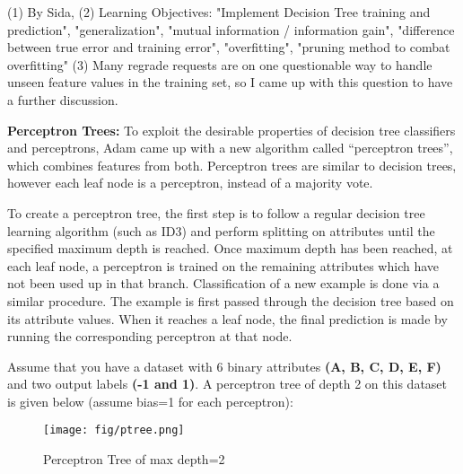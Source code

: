 \begin{questions}
\begin{qauthor}
    (1) By Sida, (2) Learning Objectives: "Implement Decision Tree training and prediction", "generalization", "mutual information / information gain", "difference between true error and training error", "overfitting", "pruning method to combat overfitting" (3) Many regrade requests are on one questionable way to handle unseen feature values in the training set, so I came up with this question to have a further discussion.
    \end{qauthor}

\question[]\textbf{Perceptron Trees: } To exploit the desirable properties of decision tree classifiers and perceptrons, Adam came up with a new algorithm called ``perceptron trees'', which combines features from both. Perceptron trees are similar to decision trees, however each leaf node is a perceptron, instead of a majority vote. 

To create a perceptron tree, the first step is to follow a regular decision tree learning algorithm (such as ID3) and perform splitting on attributes until the specified maximum depth is reached. Once maximum depth has been reached, at each leaf node, a perceptron is trained on the remaining attributes which have not been used up in that branch. Classification of a new example is done via a similar procedure. The example is first passed through the decision tree based on its attribute values. When it reaches a leaf node, the final prediction is made by running the corresponding perceptron at that node.

Assume that you have a dataset with 6 binary attributes \textbf{(A, B, C, D, E, F)} and two output labels \textbf{(-1 and 1)}. A perceptron tree of depth 2 on this dataset is given below (assume bias=1 for each perceptron):

\begin{figure}[H]
        \centering
        \texttt{[image: fig/ptree.png]}
        \caption{Perceptron Tree of max depth=2}
        \label{L1_norm}
\end{figure}

    \noaddpoints %
\end{questions}
